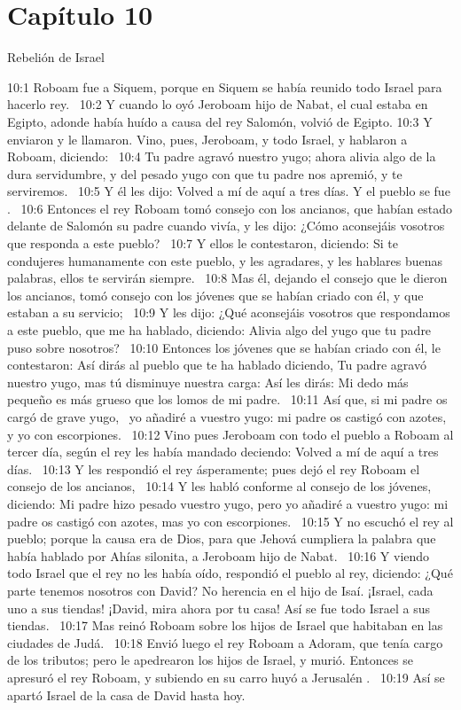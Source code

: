 									\section*{Capítulo 10 }
										Rebelión de Israel  
										
										
										10:1 Roboam fue a Siquem, porque en Siquem se había reunido todo Israel para hacerlo rey.  
										10:2 Y cuando lo oyó Jeroboam hijo de Nabat, el cual estaba en Egipto, adonde había huído a causa del rey Salomón, volvió de Egipto. 
										10:3 Y enviaron y le llamaron. Vino, pues, Jeroboam, y todo Israel, y hablaron a Roboam, diciendo:  
										10:4 Tu padre agravó nuestro yugo; ahora alivia algo de la dura servidumbre, y del pesado yugo con que tu padre nos apremió, y te serviremos.  
										10:5 Y él les dijo: Volved a mí de aquí a tres días. Y el pueblo se fue .  
										10:6 Entonces el rey Roboam tomó consejo con los ancianos, que habían estado delante de Salomón su padre cuando vivía, y les dijo: ¿Cómo aconsejáis vosotros que responda a este pueblo?  
										10:7 Y ellos le contestaron, diciendo: Si te condujeres humanamente con este pueblo, y les agradares, y les hablares buenas palabras, ellos te servirán siempre.  
										10:8 Mas él, dejando el consejo que le dieron los ancianos, tomó consejo con los jóvenes que se habían criado con él, y que estaban a su servicio;  
										10:9 Y les dijo: ¿Qué aconsejáis vosotros que respondamos a este pueblo, que me ha hablado, diciendo: Alivia algo del yugo que tu padre puso sobre nosotros?  
										10:10 Entonces los jóvenes que se habían criado con él, le contestaron: Así dirás al pueblo que te ha hablado diciendo, Tu padre agravó nuestro yugo, mas tú disminuye nuestra carga: Así les dirás: Mi dedo más pequeño es más grueso que los lomos de mi padre.  
										10:11 Así que, si mi padre os cargó de grave yugo,  yo añadiré a vuestro yugo: mi padre os castigó con azotes, y yo con escorpiones.  
										10:12 Vino pues Jeroboam con todo el pueblo a Roboam al tercer día, según el rey les había mandado deciendo: Volved a mí de aquí a tres días.  
										10:13 Y les respondió el rey ásperamente; pues dejó el rey Roboam el consejo de los ancianos,  
										10:14 Y les habló conforme al consejo de los jóvenes, diciendo: Mi padre hizo pesado vuestro yugo, pero yo añadiré a vuestro yugo: mi padre os castigó con azotes, mas yo con escorpiones.  
										10:15 Y no escuchó el rey al pueblo; porque la causa era de Dios, para que Jehová cumpliera la palabra que había hablado por Ahías silonita, a Jeroboam hijo de Nabat.  
										10:16 Y viendo todo Israel que el rey no les había oído, respondió el pueblo al rey, diciendo: ¿Qué parte tenemos nosotros con David? No herencia en el hijo de Isaí. ¡Israel, cada uno a sus tiendas! ¡David, mira ahora por tu casa! Así se fue todo Israel a sus tiendas.  
										10:17 Mas reinó Roboam sobre los hijos de Israel que habitaban en las ciudades de Judá.  
										10:18 Envió luego el rey Roboam a Adoram, que tenía cargo de los tributos; pero le apedrearon los hijos de Israel, y murió. Entonces se apresuró el rey Roboam, y subiendo en su carro huyó a Jerusalén .  
										10:19 Así se apartó Israel de la casa de David hasta hoy.  
